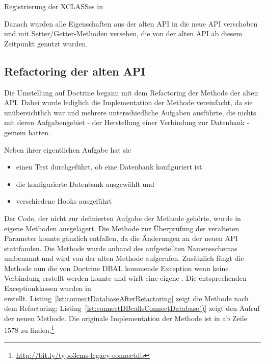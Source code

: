 \begin{listing}[H]
\caption{Registrierung der XCLASSes in }
\label{lst:xclassDatabaseAPI}
\end{listing}

Danach wurden alle Eigenschaften aus der alten API in die neue API verschoben und mit Setter/Getter-Methoden versehen, die von der alten API ab diesem Zeitpunkt genutzt wurden.

\subsection{Refactoring der alten API}
Die Umstellung auf Doctrine begann mit dem Refactoring der Methode  der alten API. Dabei wurde lediglich die Implementation der Methode vereinfacht, da sie unübersichtlich war und mehrere unterschiedliche Aufgaben ausführte, die nichts mit deren Aufgabengebiet - der Herstellung einer Verbindung zur Datenbank - gemein hatten.

Neben ihrer eigentlichen Aufgabe hat sie

\begin{itemize}
	\item einen Test durchgeführt, ob eine Datenbank konfiguriert ist
	\item die konfigurierte Datenbank ausgewählt und
	\item verschiedene Hooks ausgeführt
\end{itemize}

Der Code, der nicht zur definierten Aufgabe der Methode gehörte, wurde in eigene Methoden ausgelagert. Die Methode zur Überprüfung der veralteten Parameter konnte gänzlich entfallen, da die Änderungen an der neuen API stattfanden. Die Methode wurde anhand des aufgestellten Namensschemas umbenannt und wird von der alten Methode aufgerufen. Zusätzlich fängt die Methode nun die von Doctrine DBAL kommende Exception wenn keine Verbindung erstellt werden konnte und wirft eine eigene . Die entsprechenden Exceptionklassen wurden in\\  erstellt. Listing~\ref{lst:connectDatabaseAfterRefactoring} zeigt die Methode nach dem Refactoring; Listing~\ref{lst:connectDBcallsConnectDatabase()} zeigt den Aufruf der neuen Methode. Die originale Implementation der Methode ist in  ab Zeile 1578 zu finden.\footnote{\url{http://bit.ly/typo3cms-legacy-connectdb}}

